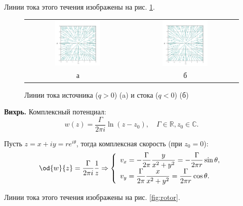 \documentclass[a4paper, 14pt]{extarticle}
\begin{document}
\begin{problems}
Линии тока этого течения изображены на рис. \ref{fig:source_sink}.

\begin{figure}
	\centering
	\begin{tabular}{cc}
	\includegraphics[width=0.45\textwidth]{../img/source.pdf} &
	\includegraphics[width=0.45\textwidth]{../img/sink.pdf} \\
	а & б 
	\end{tabular}
	\caption{Линии тока источника ($q>0$) (a) и стока ($q<0$) (б)}
	\label{fig:source_sink}
\end{figure}

\item
\textbf{Вихрь.} Комплексный потенциал:
\[
	w(z) = \frac{\Gamma}{2\pi i}\ln(z-z_0),\quad
	\Gamma \in\mathbb{R}, z_0\in\mathbb{C}.
\]
			
Пусть $z=x+iy=re^{i\theta}$, тогда комплексная скорость (при $z_0=0$):
\[
	\od{w}{z} = \frac{\Gamma}{2\pi i}\frac{1}{z} \Rightarrow 
	\left\{
	\begin{array}{l}
		\displaystyle	v_x = -\frac{\Gamma}{2\pi}\frac{y}{x^2+y^2} = -\frac{\Gamma}{2\pi r}\sin\theta,\\
		\displaystyle	v_y = \frac{\Gamma}{2\pi}\frac{x}{x^2+y^2} = \frac{\Gamma}{2\pi r}\cos\theta.
	\end{array}
	\right.
\]

Линии тока этого течения изображены на рис. \ref{fig:rotor}.


\end{problems}
\end{document}
